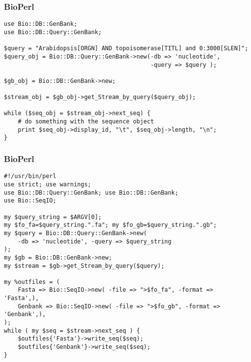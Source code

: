 \begin{frame}[fragile]
  \frametitle{BioPerl}
\begin{lstlisting}[basicstyle=\footnotesize\tt,numberstyle=\scriptsize]
use Bio::DB::GenBank;
use Bio::DB::Query::GenBank;

$query = "Arabidopsis[ORGN] AND topoisomerase[TITL] and 0:3000[SLEN]"; 
$query_obj = Bio::DB::Query::GenBank->new(-db => 'nucleotide', 
                                          -query => $query );

$gb_obj = Bio::DB::GenBank->new;

$stream_obj = $gb_obj->get_Stream_by_query($query_obj);

while ($seq_obj = $stream_obj->next_seq) {
    # do something with the sequence object    
    print $seq_obj->display_id, "\t", $seq_obj->length, "\n";
}
\end{lstlisting}
\end{frame}

\begin{frame}[fragile]
  \frametitle{BioPerl}
\begin{lstlisting}[basicstyle=\scriptsize\tt,numberstyle=\tiny]
#!/usr/bin/perl
use strict; use warnings;
use Bio::DB::Query::GenBank; use Bio::DB::GenBank;
use Bio::SeqIO;

my $query_string = $ARGV[0];
my $fo_fa=$query_string.".fa"; my $fo_gb=$query_string.".gb";
my $query = Bio::DB::Query::GenBank->new(
    -db => 'nucleotide', -query => $query_string
);
my $gb = Bio::DB::GenBank->new;
my $stream = $gb->get_Stream_by_query($query);

my %outfiles = (
    Fasta => Bio::SeqIO->new( -file => ">$fo_fa", -format => 'Fasta',),
    Genbank => Bio::SeqIO->new( -file => ">$fo_gb", -format => 'Genbank',),
);
while ( my $seq = $stream->next_seq ) {
    $outfiles{'Fasta'}->write_seq($seq);
    $outfiles{'Genbank'}->write_seq($seq);
}
\end{lstlisting}
\end{frame}



